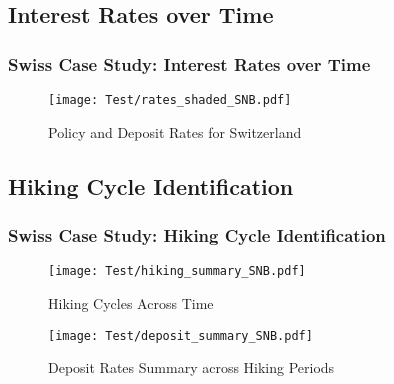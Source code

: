 \documentclass{beamer}
\begin{document}
\subsection{Interest Rates over Time}
\begin{frame}
\frametitle{Swiss Case Study: Interest Rates over Time}
\begin{center}
\begin{minipage}{0.8\textwidth}
\begin{figure}[H]
    \texttt{[image: Test/rates\_shaded\_SNB.pdf]}
    \caption{Policy and Deposit Rates for Switzerland}
    \label{fig:rates_shaded}
\end{figure}
\end{minipage}
\end{center}
\end{frame}

\subsection{Hiking Cycle Identification}
\begin{frame}
\frametitle{Swiss Case Study: Hiking Cycle Identification}

\begin{center}
\begin{minipage}{0.8\textwidth}
\begin{figure}[H]
    \texttt{[image: Test/hiking\_summary\_SNB.pdf]}
    \caption{Hiking Cycles Across Time}
    \label{fig:hiking_summary}
\end{figure}
\end{minipage}
\end{center}

\begin{center}
\begin{minipage}{0.8\textwidth}
\begin{figure}[H]
    \texttt{[image: Test/deposit\_summary\_SNB.pdf]}
    \caption{Deposit Rates Summary across Hiking Periods}
    \label{fig:deposit_summary}
\end{figure}
\end{minipage}
\end{center}
\end{frame}
\end{document}
